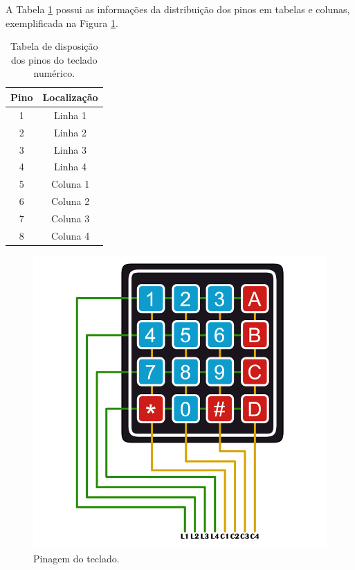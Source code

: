 A Tabela \ref{table:pinosteclado} possui as informações da distribuição dos pinos em tabelas e colunas, exemplificada na Figura \ref{fig:teclado-pins}.

\begin{table}[h!]
	\begin{center}
		\begin{tabular}{ |c|c| }
			\hline
			\rowcolor{lightgray} Pino & Localização \\
			 \hline 
				1 & Linha 1 \\
			 \hline 
				2 & Linha 2 \\
			 \hline 
				3 & Linha 3 \\
			 \hline 
				4 & Linha 4 \\
			 \hline 
				5 & Coluna 1 \\
			 \hline 
				6 & Coluna 2 \\
			 \hline 
				7 & Coluna 3 \\
			 \hline 
				8 & Coluna 4 \\
			\hline
		\end{tabular}
	\caption{Tabela de disposição dos pinos do teclado numérico.}
	\label{table:pinosteclado}
	\end{center}
\end{table}

\begin{figure}[htbp]
	\centering
	\includegraphics[scale=0.3]{figuras/keypad-1024x1024-pins.png}
	\caption{Pinagem do teclado.}
	\label{fig:teclado-pins}
\end{figure}

